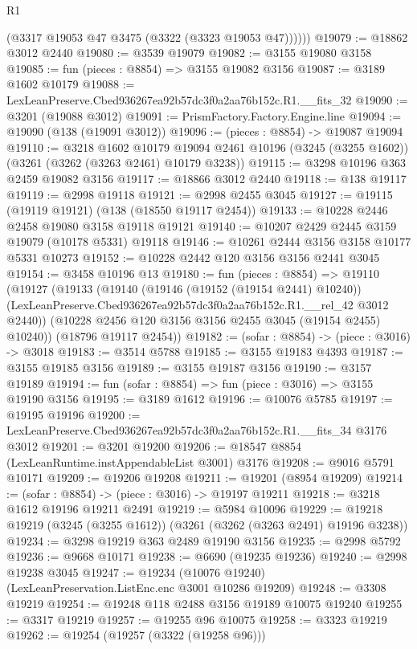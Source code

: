 \begin{lexlean}{R1}
\begin{coremodule}
          (@3317 @19053 @47 @3475 (@3322 (@3323 @19053 @47))))))
@19079 := @18862 @3012 @2440
@19080 := @3539 @19079
@19082 := @3155 @19080 @3158
@19085 := fun (pieces : @8854) => @3155 @19082 @3156
@19087 := @3189 @1602 @10179
@19088 := LexLeanPreserve.Cbed936267ea92b57dc3f0a2aa76b152c.R1.__fits_32
@19090 := @3201 (@19088 @3012)
@19091 := PrismFactory.Factory.Engine.line
@19094 := @19090 (@138 (@19091 @3012))
@19096 := (pieces : @8854) -> @19087 @19094
@19110 := @3218
    @1602
    @10179
    @19094
    @2461
    @10196
    (@3245 (@3255 @1602))
    (@3261 (@3262 (@3263 @2461) @10179 @3238))
@19115 := @3298 @10196 @363 @2459 @19082 @3156
@19117 := @18866 @3012 @2440
@19118 := @138 @19117
@19119 := @2998 @19118
@19121 := @2998 @2455 @3045
@19127 := @19115 (@19119 @19121) (@138 (@18550 @19117 @2454))
@19133 := @10228 @2446 @2458 @19080 @3158 @19118 @19121
@19140 := @10207 @2429 @2445 @3159 @19079 (@10178 @5331) @19118
@19146 := @10261 @2444 @3156 @3158 @10177 @5331 @10273
@19152 := @10228 @2442 @120 @3156 @3156 @2441 @3045
@19154 := @3458 @10196 @13
@19180 := fun (pieces : @8854) =>
  @19110
    (@19127
      (@19133
        (@19140
          (@19146 (@19152 (@19154 @2441) @10240))
          (LexLeanPreserve.Cbed936267ea92b57dc3f0a2aa76b152c.R1.__rel_42 @3012 @2440))
        (@10228 @2456 @120 @3156 @3156 @2455 @3045 (@19154 @2455) @10240))
      (@18796 @19117 @2454))
@19182 := (sofar : @8854) -> (piece : @3016) -> @3018
@19183 := @3514 @5788
@19185 := @3155 @19183 @4393
@19187 := @3155 @19185 @3156
@19189 := @3155 @19187 @3156
@19190 := @3157 @19189
@19194 := fun (sofar : @8854) => fun (piece : @3016) => @3155 @19190 @3156
@19195 := @3189 @1612
@19196 := @10076 @5785
@19197 := @19195 @19196
@19200 := LexLeanPreserve.Cbed936267ea92b57dc3f0a2aa76b152c.R1.__fits_34 @3176 @3012
@19201 := @3201 @19200
@19206 := @18547 @8854 (LexLeanRuntime.instAppendableList @3001) @3176
@19208 := @9016 @5791 @10171
@19209 := @19206 @19208
@19211 := @19201 (@8954 @19209)
@19214 := (sofar : @8854) -> (piece : @3016) -> @19197 @19211
@19218 := @3218 @1612 @19196 @19211 @2491
@19219 := @5984 @10096
@19229 := @19218 @19219 (@3245 (@3255 @1612)) (@3261 (@3262 (@3263 @2491) @19196 @3238))
@19234 := @3298 @19219 @363 @2489 @19190 @3156
@19235 := @2998 @5792
@19236 := @9668 @10171
@19238 := @6690 (@19235 @19236)
@19240 := @2998 @19238 @3045
@19247 := @19234 (@10076 @19240) (LexLeanPreservation.ListEnc.enc @3001 @10286 @19209)
@19248 := @3308 @19219
@19254 := @19248 @118 @2488 @3156 @19189 @10075 @19240
@19255 := @3317 @19219
@19257 := @19255 @96 @10075
@19258 := @3323 @19219
@19262 := @19254 (@19257 (@3322 (@19258 @96)))

\end{coremodule}
\end{lexlean}
